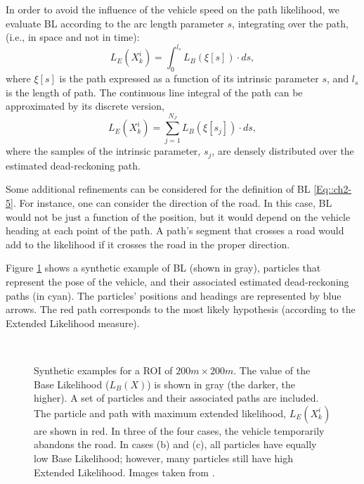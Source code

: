 In order to avoid the influence of the vehicle speed on the path likelihood, we evaluate BL according to the arc length parameter $s$, integrating over the path, (i.e., in space and not in time):
\begin{equation}
\label{Eq::ch2-8}
L_E (X_k^i )=\int_{0}^{l_s} L_B(\xi[s]) \cdotp ds,
\end{equation}
where $\xi[s]$ is the path expressed as a function of its intrinsic parameter $s$, and $l_s$ is the length of path. The continuous line integral of the path can be approximated by its discrete version,
\begin{equation}
\label{Eq::ch2-9}
L_E (X_k^i )=\sum_{j=1}^{N_J} L_B(\xi[s_j]) \cdotp ds,
\end{equation}
where the samples of the intrinsic parameter, $s_j$, are densely distributed over the estimated dead-reckoning path.

Some additional refinements can be considered for the definition of BL \ref{Eq::ch2-5}. For instance, one can consider the direction of the road. In this case, BL would not be just a function of the position, but it would depend on the vehicle heading at each point of the path. A path's segment that crosses a road would add to the likelihood if it crosses the road in the proper direction.

Figure \ref{Fig::ROI} shows a synthetic example of BL (shown in gray), particles that represent the pose of the vehicle, and their associated estimated dead-reckoning paths (in cyan). The particles' positions and headings are represented by blue arrows. The red path corresponds to the most likely hypothesis (according to the Extended Likelihood measure).

\begin{figure}[th]
\centering
    \\
\caption{Synthetic examples for a ROI of $200m\times200m$. The value of the Base Likelihood ($L_B(X)$) is shown in gray (the darker, the higher). A set of particles and their associated paths are included. The particle and path with maximum extended likelihood, $L_E(X_k^i)$ are shown in red. In three of the four cases, the vehicle temporarily abandons the road. In cases (b) and (c), all particles have equally low Base Likelihood; however, many particles still have high Extended Likelihood. Images taken from \cite{guivant2010robust}.}
\label{Fig::ROI} 
\end{figure}


